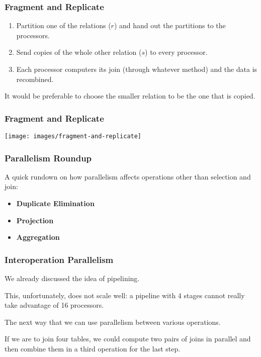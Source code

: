 \begin{frame}
\frametitle{Fragment and Replicate}

\begin{enumerate}
\item Partition one of the relations ($r$) and hand out the partitions to the processors.
\item Send copies of the whole other relation ($s$) to every processor.
\item Each processor computers its join (through whatever method) and the data is recombined. 
\end{enumerate}

It would be preferable to choose the smaller relation to be the one that is copied.

\end{frame}

\begin{frame}
\frametitle{Fragment and Replicate}

\begin{center}
\texttt{[image: images/fragment-and-replicate]}
\end{center}

\end{frame}


\begin{frame}
\frametitle{Parallelism Roundup}

A quick rundown on how parallelism affects operations other than selection and join:
\begin{itemize}
\item \textbf{Duplicate Elimination}
\item \textbf{Projection}
\item \textbf{Aggregation}
\end{itemize}

\end{frame}

\begin{frame}
\frametitle{Interoperation Parallelism }

We already discussed the idea of pipelining.

This, unfortunately, does not scale well: a pipeline with 4 stages cannot really take advantage of 16 processors.

The next way that we can use parallelism between various operations. 

If we are to join four tables, we could compute two pairs of joins in parallel and then combine them in a third operation for the last step. 

\end{frame}



